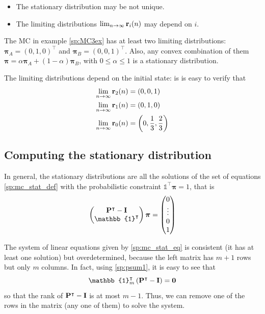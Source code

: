 \begin{itemize}
\item The stationary distribution may be not unique.
\item The limiting distributions $\lim_{n \rightarrow \infty} {\bf r}_i(n)$ may depend on $i$.
\end{itemize}

\begin{example}

The MC in example \ref{sp:MC3ex} has at least two limiting distributions: $\bm{\pi}_A = (0, 1, 0)^\intercal$ and $\bm{\pi}_B = (0, 0, 1)^\intercal$. Also, any convex combination of them $\bm{\pi} = \alpha \bm{\pi}_A + (1-\alpha) \bm{\pi}_B$, with $0\le \alpha \le 1$ is a stationary distribution. 

The limiting distributions depend on the initial state: is is easy to verify that 
\begin{align}
\lim_{n \rightarrow \infty} {\bf r}_2(n) &= (0, 0, 1)  \\
\lim_{n \rightarrow \infty} {\bf r}_1(n) &= (0, 1, 0)  \\
\lim_{n \rightarrow \infty} {\bf r}_0(n) &= \left(0, \frac13, \frac23 \right)
\end{align}

\end{example}

\subsection{Computing the stationary distribution}

In general, the stationary distributions are all the solutions of the set of equations \eqref{sp:mc_stat_def} with the probabilistic constraint $\mathbb{1}^\intercal \bm{\pi} =1$, that is
\begin{align}
\label{sp:mc_stat_eq}
\begin{pmatrix}
{\bf P}^\intercal - {\bf I}  \\
\mathbb{1}^\intercal   
\end{pmatrix}
\bm{\pi} = 
\begin{pmatrix}
0 \\ \vdots \\ 0 \\ 1
\end{pmatrix}
\end{align}

The system of linear equations given by \eqref{sp:mc_stat_eq} is consistent (it has at least one solution) but overdetermined, because the left matrix has $m+1$ rows but only $m$ columns. In fact, using \eqref{sp:psum1}, it is easy to see that 
\begin{equation}
\mathbb{1}_m^\intercal \left({\bf P}^\intercal - {\bf I}\right)  = {\bf 0}
\end{equation}
so that the rank of ${\bf P}^\intercal - {\bf I}$ is at most $m-1$. Thus, we can remove one of the rows in the matrix (any one of them) to solve the system.

